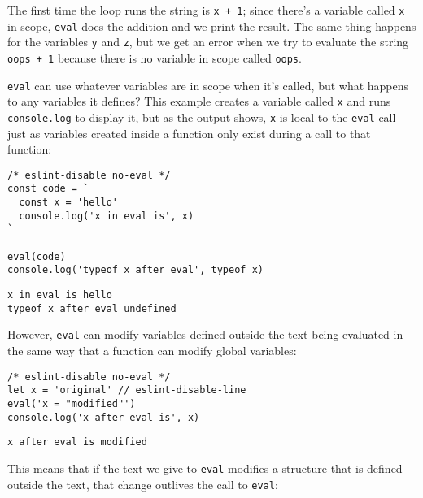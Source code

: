 \documentclass[krantzl]{krantz}
\begin{document}
\noindent The first time the loop runs the string is \texttt{{\textquotesingle}x + 1{\textquotesingle}};
since there's a variable called \texttt{x} in scope,
\texttt{eval} does the addition and we print the result.
The same thing happens for the variables \texttt{y} and \texttt{z},
but we get an error when we try to evaluate the string \texttt{{\textquotesingle}oops + 1{\textquotesingle}}
because there is no variable in scope called \texttt{oops}.


\texttt{eval} can use whatever variables are in scope when it's called,
but what happens to any variables it defines?
This example creates a variable called \texttt{x} and runs \texttt{console.log} to display it,
but as the output shows,
\texttt{x} is local to the \texttt{eval} call
just as variables created inside a function
only exist during a call to that function:


\begin{lstlisting}[frame=single,frameround=tttt]
/* eslint-disable no-eval */
const code = `
  const x = 'hello'
  console.log('x in eval is', x)
`

eval(code)
console.log('typeof x after eval', typeof x)
\end{lstlisting}



\begin{lstlisting}[frame=single,frameround=tttt]
x in eval is hello
typeof x after eval undefined
\end{lstlisting}



However,
\texttt{eval} can modify variables defined outside the text being evaluated
in the same way that a function can modify global variables:


\begin{lstlisting}[frame=single,frameround=tttt]
/* eslint-disable no-eval */
let x = 'original' // eslint-disable-line
eval('x = "modified"')
console.log('x after eval is', x)
\end{lstlisting}



\begin{lstlisting}[frame=single,frameround=tttt]
x after eval is modified
\end{lstlisting}



\noindent This means that
if the text we give to \texttt{eval} modifies a structure that is defined outside the text,
that change outlives the call to \texttt{eval}:
\end{document}
